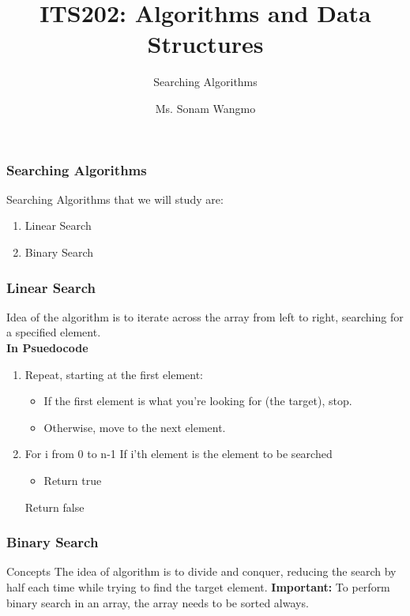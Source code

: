 \documentclass[11pt]{beamer}
\begin{document}
	\author{Ms. Sonam Wangmo}
	\title{ITS202: Algorithms and Data Structures}
	\subtitle{Searching Algorithms}
	\institute{
		\textcolor{blue}{Gyalpozhing College of Information Technology \\ Royal University of Bhutan} \\
		\vspace{0.5cm}
	}

	\begin{frame}[plain]
		\maketitle
	\end{frame}
	\begin{frame}
		\frametitle{Searching Algorithms}
		Searching Algorithms that we will study are: 
		\begin{enumerate}
			\item Linear Search
			\item Binary Search
		\end{enumerate}		 
	\end{frame}
	
	\begin{frame}
		\frametitle{Linear Search}
			Idea of the algorithm is to iterate across the array from left to right, searching for a specified element. \\
			\textbf{In Psuedocode}
			\begin{enumerate}
				\item Repeat, starting at the first element:
				\begin{itemize}
					\item If the first element is what you’re looking for (the target), stop.
					\item Otherwise, move to the next element.
				\end{itemize} 
				\item For i from 0 to n-1
				If i’th element is the element to be searched
				\begin{itemize}
						\item Return true \\
				\end{itemize}
				Return false
				\end{enumerate}		 
	\end{frame}

\begin{frame}
	\frametitle{Binary Search}
	 \begin{block}{Concepts}
	 The idea of algorithm is to divide and conquer, reducing the search by half each time while trying to find the target element.
	\textbf{Important:}  To perform binary search in an array, the array needs to be sorted always.
	 \end{block}
\end{frame}
\end{document}
